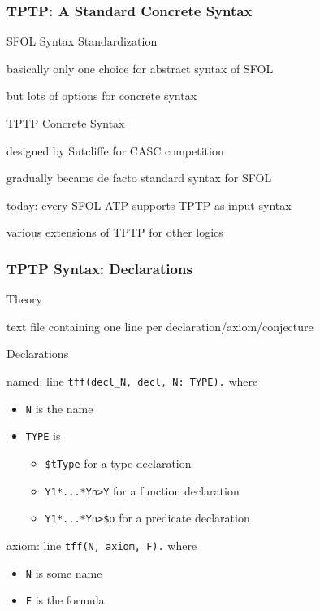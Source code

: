 \begin{frame}\frametitle{TPTP: A Standard Concrete Syntax}
\begin{blockitems}{SFOL Syntax Standardization}
\item basically only one choice for abstract syntax of SFOL
\item but lots of options for concrete syntax
\end{blockitems}

\begin{blockitems}{TPTP Concrete Syntax}
\item designed by Sutcliffe for CASC competition
\item gradually became de facto standard syntax for SFOL
\item today: every SFOL ATP supports TPTP as input syntax
\item various extensions of TPTP for other logics
\end{blockitems}

\end{frame}

\begin{frame}[fragile]\frametitle{TPTP Syntax: Declarations}
\begin{blockitems}{Theory}
\item text file containing one line per declaration/axiom/conjecture
\end{blockitems}

\begin{blockitems}{Declarations}
\item named: line \lstinline|tff(decl_N, decl, N: TYPE).| where
\begin{itemize}
\item \lstinline|N| is the name
\item \lstinline|TYPE| is
 \begin{itemize}
 \item \lstinline[mathescape=false]|$tType| for a type declaration
 \item \lstinline|Y1*...*Yn>Y| for a function declaration
 \item \lstinline[mathescape=false]|Y1*...*Yn>$o| for a predicate declaration
 \end{itemize}
\end{itemize}
\item axiom: line \lstinline|tff(N, axiom, F).| where
\begin{itemize}
\item \lstinline|N| is some name
\item \lstinline|F| is the formula
\end{itemize}
\end{blockitems}
\end{frame}

